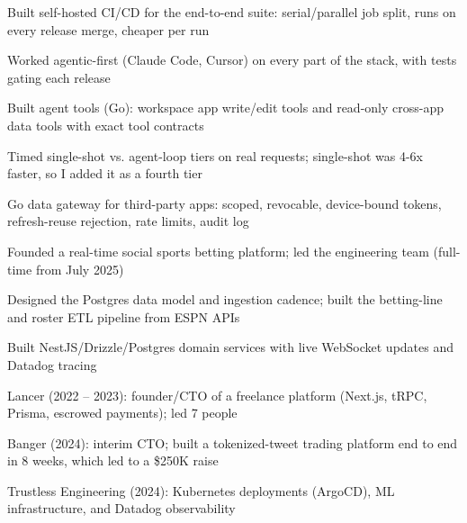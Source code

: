 \documentclass[print]{jack-resume}
\begin{document}
\begin{tightemize}
    \item Built self-hosted CI/CD for the end-to-end suite: serial/parallel job split, runs on every release merge, cheaper per run
    \item Worked agentic-first (Claude Code, Cursor) on every part of the stack, with tests gating each release
    \item Built agent tools (Go): workspace app write/edit tools and read-only cross-app data tools with exact tool contracts
    \item Timed single-shot vs. agent-loop tiers on real requests; single-shot was 4-6x faster, so I added it as a fourth tier
    \item Go data gateway for third-party apps: scoped, revocable, device-bound tokens, refresh-reuse rejection, rate limits, audit log
\end{tightemize}
\sectionsep

\begin{tightemize}
    \item Founded a real-time social sports betting platform; led the engineering team (full-time from July 2025)
    \item Designed the Postgres data model and ingestion cadence; built the betting-line and roster ETL pipeline from ESPN APIs
    \item Built NestJS/Drizzle/Postgres domain services with live WebSocket updates and Datadog tracing
\end{tightemize}
\sectionsep

\begin{tightemize}
    \item Lancer (2022 -- 2023): founder/CTO of a freelance platform (Next.js, tRPC, Prisma, escrowed payments); led 7 people
    \item Banger (2024): interim CTO; built a tokenized-tweet trading platform end to end in 8 weeks, which led to a \$250K raise
    \item Trustless Engineering (2024): Kubernetes deployments (ArgoCD), ML infrastructure, and Datadog observability
\end{tightemize}
\sectionsep
\end{document}
